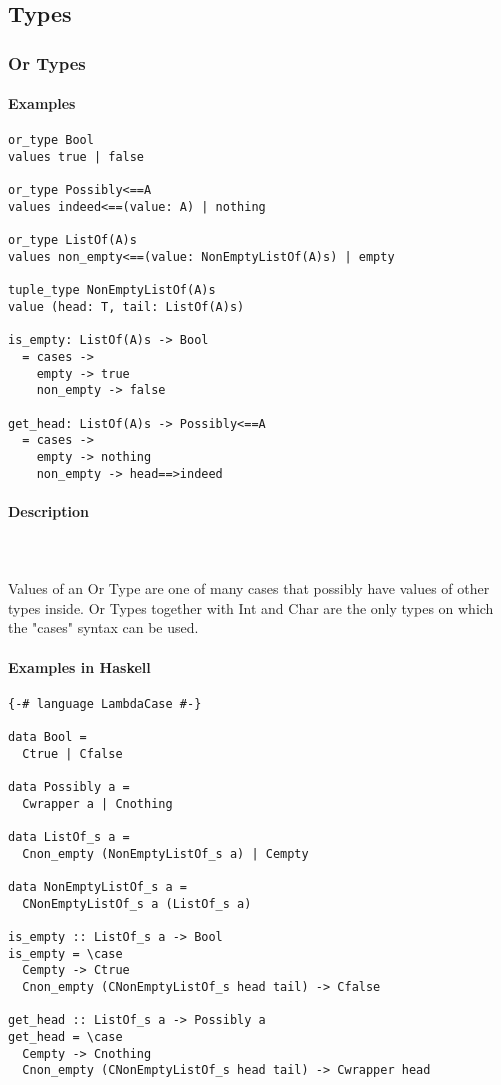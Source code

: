\documentclass{article}
\def\H{Haskell}
\begin{document}
\subsection{Types}

\subsubsection{Or Types}

\paragraph{Examples}

\begin{verbatim}
or_type Bool
values true | false

or_type Possibly<==A
values indeed<==(value: A) | nothing

or_type ListOf(A)s
values non_empty<==(value: NonEmptyListOf(A)s) | empty

tuple_type NonEmptyListOf(A)s
value (head: T, tail: ListOf(A)s)

is_empty: ListOf(A)s -> Bool
  = cases -> 
    empty -> true
    non_empty -> false

get_head: ListOf(A)s -> Possibly<==A
  = cases -> 
    empty -> nothing
    non_empty -> head==>indeed
\end{verbatim}

\paragraph{Description}\mbox{} \\\\
Values of an Or Type are one of many cases that possibly have values of other types
inside. Or Types together with Int and Char are the only types on which the "cases"
syntax can be used.

\paragraph{Examples in \H}

\begin{verbatim}
{-# language LambdaCase #-}

data Bool =
  Ctrue | Cfalse

data Possibly a =
  Cwrapper a | Cnothing

data ListOf_s a =
  Cnon_empty (NonEmptyListOf_s a) | Cempty

data NonEmptyListOf_s a =
  CNonEmptyListOf_s a (ListOf_s a)

is_empty :: ListOf_s a -> Bool
is_empty = \case
  Cempty -> Ctrue
  Cnon_empty (CNonEmptyListOf_s head tail) -> Cfalse

get_head :: ListOf_s a -> Possibly a
get_head = \case
  Cempty -> Cnothing
  Cnon_empty (CNonEmptyListOf_s head tail) -> Cwrapper head
\end{verbatim}
\end{document}
